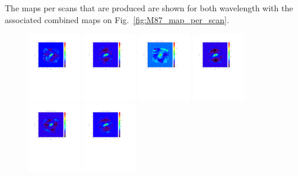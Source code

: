 \documentclass[a4paper]{article}
\begin{document}
The maps per scans that are produced are shown for both wavelength with the associated combined maps on Fig.~\ref{fig:M87_map_per_scan}.
\begin{figure}
\centering
\includegraphics[height=3cm, trim=2cm 13cm 4cm 2cm, clip=true]{Figure/map_1mm_scan20121124s0104}
\includegraphics[height=3cm, trim=2cm 13cm 4cm 2cm, clip=true]{Figure/map_1mm_scan20121124s0105}
\includegraphics[height=3cm, trim=2cm 13cm 4cm 2cm, clip=true]{Figure/map_1mm_scan20121124s0107}
\includegraphics[height=3cm, trim=2cm 13cm 4cm 2cm, clip=true]{Figure/map_1mm_scan20121124s0108}
\includegraphics[height=3cm, trim=2cm 13cm 4cm 2cm, clip=true]{Figure/map_1mm_scan20121124s0109}
\includegraphics[height=3cm, trim=2cm 13cm 4cm 2cm, clip=true]{Figure/map_1mm_scan20121124s0110}

\end{figure}
\end{document}
